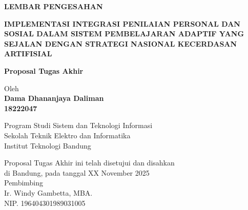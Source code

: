 \documentclass[12pt,a4paper,oneside]{book}
\begin{document}
\newpage
\thispagestyle{empty}
\begin{center}
  \textbf{\large LEMBAR PENGESAHAN}\\[1cm]
  \vspace*{1.5cm}
    
  {\large\bfseries\uppercase{Implementasi Integrasi Penilaian Personal dan Sosial dalam Sistem Pembelajaran Adaptif yang Sejalan dengan Strategi Nasional Kecerdasan Artifisial}}\\
     \vspace{2cm}

  {\Large \textbf{Proposal Tugas Akhir}}\\


  \vspace{1.5cm}
    
    
  {\large Oleh}\\[0.3cm]
    \textbf{
    {\large Dama Dhananjaya Daliman}\\
    {\large 18222047}
  }\\
    
  \vspace{0.5cm}
 
  {\large Program Studi Sistem dan Teknologi Informasi}\\
  {\large Sekolah Teknik Elektro dan Informatika}\\
  {\large Institut Teknologi Bandung}\\

  \vspace{1.5cm}

  Proposal Tugas Akhir ini telah disetujui dan disahkan\\ 
  di Bandung, pada tanggal XX November 2025\\[1cm]

	Pembimbing  \\[3cm]
	Ir. Windy Gambetta, MBA.   \\[0.2cm]
	NIP. 196404301989031005 

\end{center}

\vspace{1cm}
\noindent

\end{document}
